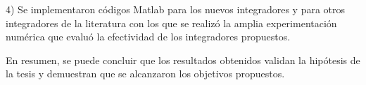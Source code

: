 \begin{conclusions}
	4) Se implementaron códigos Matlab para los nuevos integradores y para otros integradores de la literatura con los que se realizó la amplia experimentación numérica que evaluó la efectividad de los integradores propuestos.
	
	En resumen, se puede concluir que los resultados obtenidos validan la hipótesis de la tesis y demuestran que se alcanzaron los objetivos propuestos. 
	
	
	

	



\end{conclusions}
